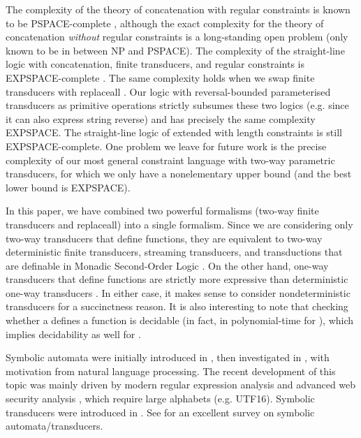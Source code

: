 The complexity of the theory of concatenation with regular constraints is
known to be PSPACE-complete \cite{Plandowski,J17}, although the exact
complexity for the theory of concatenation \emph{without} regular constraints is
a long-standing open problem (only known to be in between NP and PSPACE). 
The complexity of the straight-line logic with concatenation, finite
transducers, and regular constraints is EXPSPACE-complete \cite{LB16}. The same 
complexity holds when we swap finite transducers with replaceall 
\cite{CCHLW18}. Our logic with reversal-bounded parameterised transducers
as primitive operations strictly subsumes these two logics (e.g. since it can
also express string reverse) and has precisely the same complexity EXPSPACE.
The straight-line logic of \cite{LB16} extended with length constraints is still
EXPSPACE-complete. One problem we leave for future work is the precise 
complexity of our most general constraint language with two-way parametric 
transducers, for which we only have a nonelementary upper bound (and the best
lower bound is EXPSPACE).

In this paper, we have combined two powerful formalisms 
(two-way finite transducers and replaceall) into a single formalism. Since we 
are considering
only two-way transducers that define functions, they are equivalent to 
two-way deterministic finite transducers, streaming transducers, and
transductions that are definable in Monadic Second-Order Logic
\cite{EH01,AC10,AD11}. On the other hand, one-way transducers that define 
functions are strictly more expressive than deterministic one-way transducers
\cite{Berstel}. In either case, it makes sense to consider nondeterministic
transducers for a succinctness reason. %
It is also interesting to note that checking whether a \FFT{} defines a function
is decidable \cite{CK87} (in fact, in polynomial-time for \FT{} \cite{GI83}),
which implies decidability as well for \PPT{}.

Symbolic automata were initially introduced in \cite{Watson96}, then
investigated in \cite{NG01}, with motivation from natural language processing.
The recent development of this topic was mainly driven by modern regular
expression analysis and advanced web security analysis \cite{Vea13}, which
require large alphabets (e.g. UTF16). Symbolic transducers were introduced in 
\cite{symbolic-transducer}. See \cite{symbolic-transducer-power} for an 
excellent survey on symbolic automata/transducers. 

